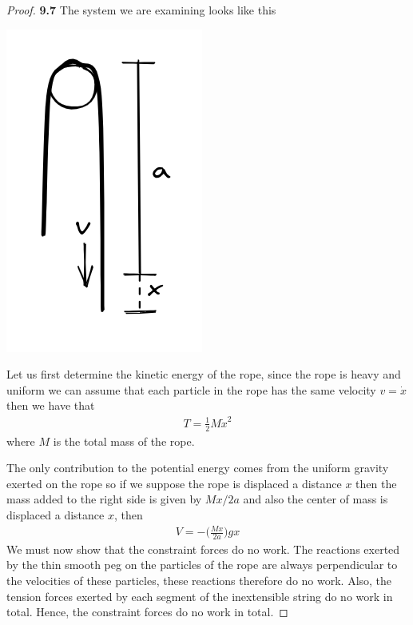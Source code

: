 \documentclass[11pt]{article}
\theoremstyle{definition}
\begin{document}
\cleardoublepage
    \begin{proof}{\textbf{9.7}}
        The system we are examining looks like this
        \begin{center}
            \includegraphics[scale=0.5]{ch9-7.png}
        \end{center}
        Let us first determine the kinetic energy of the rope, since the rope
        is heavy and uniform we can assume that each particle in the rope has
        the same velocity $v = \dot x$ then we have that
        \begin{align*}
            T = \frac{1}{2}M\dot{x}^2
        \end{align*}
        where $M$ is the total mass of the rope.

        The only contribution to the potential energy comes from the uniform
        gravity exerted on the rope so if we suppose the rope is displaced a
        distance $x$ then the mass added to the right side is given by $Mx/2a$
        and also the center of mass is displaced a distance $x$, then
        \begin{align*}
            V = -\bigg(\frac{Mx}{2a}\bigg)gx
        \end{align*}
        We must now show that the constraint forces do no work. The reactions
        exerted by the thin smooth peg on the particles of the rope are always
        perpendicular to the velocities of these particles, these reactions
        therefore do no work. Also, the tension forces exerted by each segment
        of the inextensible string do no work in total. Hence, the constraint
        forces do no work in total.


\end{proof}
\end{document}
